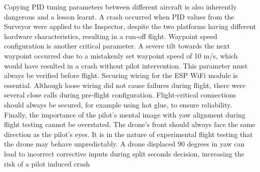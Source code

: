 Copying PID tuning parameters between different aircraft is also inherently dangerous and a lesson
learnt. A crash occurred when PID values from the Surveyor were applied to the Inspector, despite the
two platforms having different hardware characteristics, resulting in a run-off flight.
Waypoint speed configuration is another critical parameter. A severe tilt towards the next waypoint
occurred due to a mistakenly set waypoint speed of 10 m/s, which would have resulted in a crash without
pilot intervention. This parameter must always be verified before flight.
Securing wiring for the ESP WiFi module is essential. Although loose wiring did not cause failures
during flight, there were several close calls during pre‑flight configuration. Flight‑critical connections
should always be secured, for example using hot glue, to ensure reliability.
Finally, the importance of the pilot’s mental image with yaw alignment during flight testing cannot be
overstated. The drone’s front should always face the same direction as the pilot’s eyes. It is in the nature
of experimental flight testing that the drone may behave unpredictably. A drone displaced 90 degrees
in yaw can lead to incorrect corrective inputs during split seconds decision, increasing the risk of a pilot
induced crash